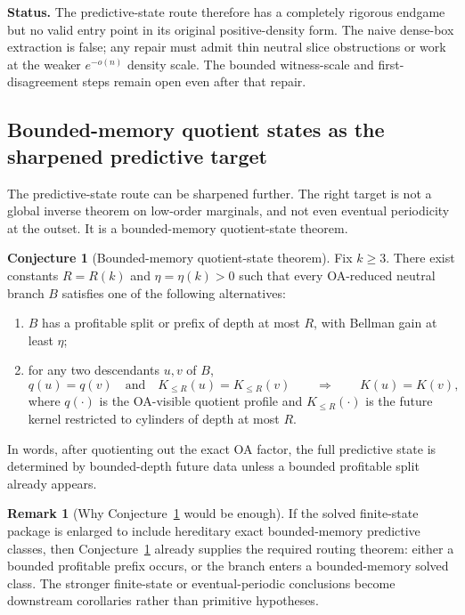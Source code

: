 \documentclass[11pt]{article}
\theoremstyle{definition}
\newtheorem{conjecture}[theorem]{Conjecture}
\newtheorem{remark}[theorem]{Remark}
\newcommand{\1}{\mathbf{1}}
\newcommand{\status}[1]{\par\smallskip\noindent\textbf{Status.} #1\par\smallskip}
\begin{document}
\status{The predictive-state route therefore has a completely rigorous endgame but no valid entry point in its original positive-density form. The naive dense-box extraction is false; any repair must admit thin neutral slice obstructions or work at the weaker $e^{-o(n)}$ density scale. The bounded witness-scale and first-disagreement steps remain open even after that repair.}




\subsection*{Bounded-memory quotient states as the sharpened predictive target}
The predictive-state route can be sharpened further.
The right target is not a global inverse theorem on low-order marginals, and not even eventual periodicity at the outset.
It is a bounded-memory quotient-state theorem.

\begin{conjecture}[Bounded-memory quotient-state theorem]\label{conj:quotient-state}
Fix $k\ge 3$.
There exist constants $R=R(k)$ and $\eta=\eta(k)>0$ such that every OA-reduced neutral branch $B$ satisfies one of the following alternatives:
\begin{enumerate}[label=(\roman*),leftmargin=2.2em]
\item $B$ has a profitable split or prefix of depth at most $R$, with Bellman gain at least $\eta$;
\item for any two descendants $u,v$ of $B$,
\[
q(u)=q(v)
\quad\text{and}\quad
K_{\le R}(u)=K_{\le R}(v)
\qquad\Longrightarrow\qquad
K(u)=K(v),
\]
where $q(\cdot)$ is the OA-visible quotient profile and $K_{\le R}(\cdot)$ is the future kernel restricted to cylinders of depth at most $R$.
\end{enumerate}
In words, after quotienting out the exact OA factor, the full predictive state is determined by bounded-depth future data unless a bounded profitable split already appears.
\end{conjecture}

\begin{remark}[Why Conjecture~\ref{conj:quotient-state} would be enough]\label{rem:quotient-state-enough}
If the solved finite-state package is enlarged to include hereditary exact bounded-memory predictive classes, then Conjecture~\ref{conj:quotient-state} already supplies the required routing theorem:
either a bounded profitable prefix occurs, or the branch enters a bounded-memory solved class.
The stronger finite-state or eventual-periodic conclusions become downstream corollaries rather than primitive hypotheses.
\end{remark}
\end{document}

